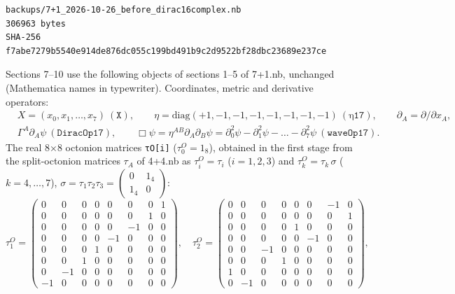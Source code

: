 \documentclass[10pt,a4paper]{article}
\begin{document}
\begin{Verbatim}[fontsize=\small,frame=single,framesep=2mm]
backups/7+1_2026-10-26_before_dirac16complex.nb
306963 bytes
SHA-256 f7abe7279b5540e914de876dc055c199bd491b9c2d9522bf28dbc23689e237ce
\end{Verbatim}
Sections 7–10 use the following objects of sections 1–5 of 7+1.nb, unchanged (Mathematica names in typewriter). Coordinates, metric and derivative operators:
\begin{align*}
&X=(x_0,x_1,\dots,x_7)\ (\texttt{X}),\qquad \eta=\mathrm{diag}(+1,-1,-1,-1,-1,-1,-1,-1)\ (\texttt{η17}),\qquad \partial_A=\partial/\partial x_A, \\
&\Gamma^A\partial_A\psi\ (\texttt{DiracOp17}),\qquad \Box\psi=\eta^{AB}\partial_A\partial_B\psi=\partial_0^2\psi-\partial_1^2\psi-\dots-\partial_7^2\psi\ (\texttt{waveOp17}).
\end{align*}
The real 8×8 octonion matrices \texttt{τO[i]} ($\tau^{O}_0=1_8$), obtained in the first stage from the split-octonion matrices $\tau_A$ of 4+4.nb as $\tau^{O}_i=\tau_i$ ($i=1,2,3$) and $\tau^{O}_k=\tau_k\,\sigma$ ($k=4,\dots,7$), $\sigma=\tau_1\tau_2\tau_3=\left(\begin{smallmatrix}0&1_4\\1_4&0\end{smallmatrix}\right)$:
\begin{equation*}
\tau^{O}_1=\begin{pmatrix}0 & 0 & 0 & 0 & 0 & 0 & 0 & 1 \\ 0 & 0 & 0 & 0 & 0 & 0 & 1 & 0 \\ 0 & 0 & 0 & 0 & 0 & -1 & 0 & 0 \\ 0 & 0 & 0 & 0 & -1 & 0 & 0 & 0 \\ 0 & 0 & 0 & 1 & 0 & 0 & 0 & 0 \\ 0 & 0 & 1 & 0 & 0 & 0 & 0 & 0 \\ 0 & -1 & 0 & 0 & 0 & 0 & 0 & 0 \\ -1 & 0 & 0 & 0 & 0 & 0 & 0 & 0\end{pmatrix},\quad \tau^{O}_2=\begin{pmatrix}0 & 0 & 0 & 0 & 0 & 0 & -1 & 0 \\ 0 & 0 & 0 & 0 & 0 & 0 & 0 & 1 \\ 0 & 0 & 0 & 0 & 1 & 0 & 0 & 0 \\ 0 & 0 & 0 & 0 & 0 & -1 & 0 & 0 \\ 0 & 0 & -1 & 0 & 0 & 0 & 0 & 0 \\ 0 & 0 & 0 & 1 & 0 & 0 & 0 & 0 \\ 1 & 0 & 0 & 0 & 0 & 0 & 0 & 0 \\ 0 & -1 & 0 & 0 & 0 & 0 & 0 & 0\end{pmatrix},
\end{equation*}
\end{document}
